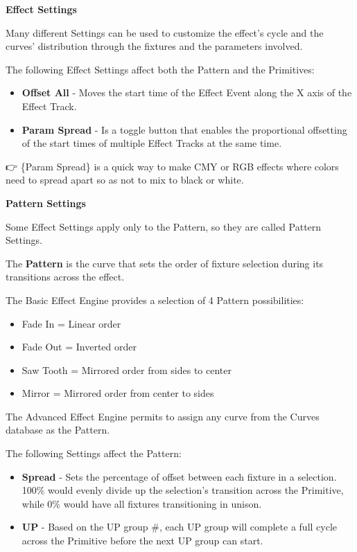 \documentclass[
]{article}
\begin{document}
\textbf{Effect Settings}

Many different Settings can be used to customize the effect's cycle and the curves' distribution through the fixtures and the parameters involved.

The following Effect Settings affect both the Pattern and the Primitives:

\begin{itemize}
\item
  \textbf{Offset All} - Moves the start time of the Effect Event along the X axis of the Effect Track.
\item
  \textbf{Param Spread} - Is a toggle button that enables the proportional offsetting of the start times of multiple Effect Tracks at the same time.
\end{itemize}

👉 \{Param Spread\} is a quick way to make CMY or RGB effects where colors need to spread apart so as not to mix to black or white.

\textbf{Pattern Settings}

Some Effect Settings apply only to the Pattern, so they are called Pattern Settings.

The \textbf{Pattern} is the curve that sets the order of fixture selection during its transitions across the effect.

The Basic Effect Engine provides a selection of 4 Pattern possibilities:

\begin{itemize}
\item
  Fade In = Linear order
\item
  Fade Out = Inverted order
\item
  Saw Tooth = Mirrored order from sides to center
\item
  Mirror = Mirrored order from center to sides
\end{itemize}

The Advanced Effect Engine permits to assign any curve from the Curves database as the Pattern.

The following Settings affect the Pattern:

\begin{itemize}
\item
  \textbf{Spread} - Sets the percentage of offset between each fixture in a selection. 100\% would evenly divide up the selection's transition across the Primitive, while 0\% would have all fixtures transitioning in unison.
\item
  \textbf{UP} - Based on the UP group \#, each UP group will complete a full cycle across the Primitive before the next UP group can start.
\end{itemize}
\end{document}
